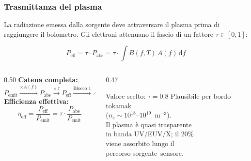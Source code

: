 \begin{frame}
\frametitle{Trasmittanza del plasma}

La radiazione emessa dalla sorgente deve attraversare il plasma prima di
raggiungere il bolometro. Gli elettroni attenuano il fascio di un fattore
$\tau \in [0,1]$:

\[
  P_\text{eff} = \tau \cdot P_\text{abs}
               = \tau \cdot \int B(f,T)\,A(f)\,\mathrm{d}f
\]

\vspace{0.3em}
\begin{columns}[T]
  \begin{column}{0.50\textwidth}
    \textbf{Catena completa:}
    \[
      P_\text{emit}
      \xrightarrow{\times A(f)} P_\text{abs}
      \xrightarrow{\times\,\tau} P_\text{eff}
      \xrightarrow{\text{Blocco 1}} \Delta V
    \]
    \vspace{0.3em}
    \textbf{Efficienza effettiva:}
    \[
      \eta_\text{eff} = \frac{P_\text{eff}}{P_\text{emit}}
                      = \tau \cdot \frac{P_\text{abs}}{P_\text{emit}}
    \]
  \end{column}
  \begin{column}{0.47\textwidth}
    \begin{block}{Valore scelto: $\tau = 0.8$}
      Plausibile per bordo tokamak\\
      ($n_e \sim 10^{18}$--$10^{19}$~m$^{-3}$).\\
      Il plasma \`e quasi trasparente\\
      in banda UV/EUV/X; il 20\%\\
      viene assorbito lungo il\\
      percorso sorgente--sensore.
    \end{block}
  \end{column}
\end{columns}

\end{frame}

